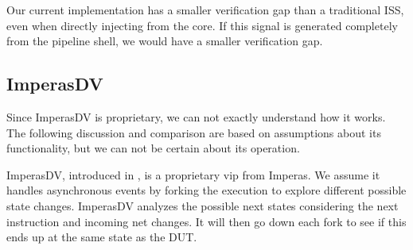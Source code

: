 %
%


Our current implementation has a smaller verification gap than a traditional ISS, even when directly injecting  from the core. If this signal is generated completely from the pipeline shell, we would have a smaller verification gap.


\subsection{ImperasDV}

Since ImperasDV is proprietary, we can not exactly understand how it works. The following discussion and comparison are based on assumptions about its functionality, but we can not be certain about its operation.

ImperasDV, introduced in , is a proprietary \acrfull{vip} from Imperas. We assume it handles asynchronous events by forking the execution to explore different possible state changes. 
ImperasDV analyzes the possible next states considering the next instruction and incoming net changes. It will then go down each fork to see if this ends up at the same state as the DUT.



